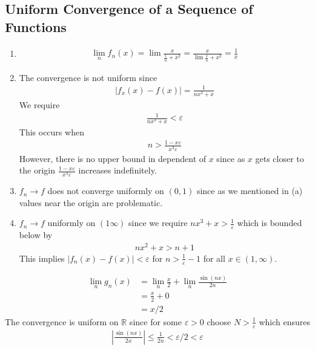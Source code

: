\subsection{Uniform Convergence of a Sequence of Functions}

\begin{enumerate}[label=(\alph*)]
    \item 
    \begin{align*}
        \lim_n f_n(x) = \lim \frac{x}{\frac{1}{n}+x^2} = \frac{x}{\lim \frac{1}{n}+x^2} = \frac{1}{x}
    \end{align*}

    \item
    The convergence is not uniform since
    \begin{align*}
        |f_x(x)-f(x)| = \frac{1}{nx^3+x}
    \end{align*}
    We require 
    \begin{align*}
        \frac{1}{nx^3+x} < \varepsilon
    \end{align*}
    This occurs when
    \begin{align*}
        n > \frac{1-x\varepsilon}{x^3 \varepsilon}
    \end{align*}
    However, there is no upper bound in dependent of $x$ since as 
    $x$ gets closer to the origin $ \frac{1-x\varepsilon}{x^3 \varepsilon}$
    increases indefinitely.
    
    \item
    $f_n \rightarrow f$ does not converge uniformly on $(0,1)$ since as 
    we mentioned in (a) values near the origin are problematic.

    \item
    $f_n\rightarrow f$ uniformly on $(1\infty)$ since we require $nx^3+x>\frac{1}{\varepsilon}$
    which is bounded below by 
    \begin{align*}
        nx^2+x > n+1
    \end{align*}
    This implies $|f_n(x)-f(x)|<\varepsilon$ for $n>\frac{1}{\varepsilon}-1$
    for all $x\in (1,\infty)$.
\end{enumerate}

\begin{align*}
    \lim_n g_n(x) &= \lim_n \frac{x}{2} + \lim_n \frac{\sin(nx)}{2n} \\
                &= \frac{x}{2} + 0 \\
                &= x/2
\end{align*}
The convergence is uniform on $\mathbb{R}$ since for some $\varepsilon>0$
choose $N>\frac{1}{\varepsilon}$ which ensures
\begin{align*}
    |\frac{\sin(nx)}{2x}| \leq \frac{1}{2n} < \varepsilon/2 < \varepsilon
\end{align*}

